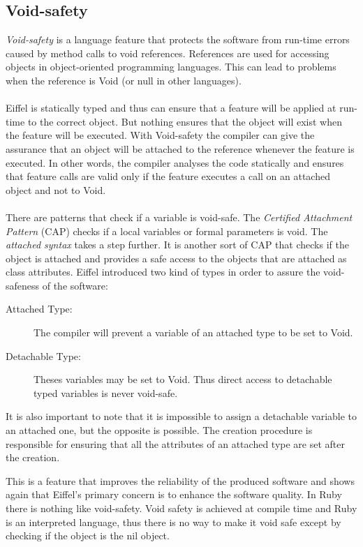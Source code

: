 \documentclass[12pt,a4paper,twocolumn]{article}
\begin{document}
\subsection{Void-safety}
\emph{Void-safety}\cite{voidSafety} is a language feature that protects the software from run-time errors caused by method calls to void references. References are used for accessing objects in object-oriented programming languages. This can lead to problems when the reference is Void (or null in other languages).
\\
\\
Eiffel is statically typed and thus can ensure that a feature will be applied at run-time to the correct object. But nothing ensures that the object will exist when the feature will be executed. With Void-safety the compiler can give the assurance that an object will be attached to the reference whenever the feature is executed. In other words, the compiler analyses the code statically and ensures that feature calls are valid only if the feature executes a call on an attached object and not to Void.
\\
\\
There are patterns that check if a variable is void-safe. The \emph{Certified Attachment Pattern} (CAP) checks if a local variables or formal parameters is void. The \emph{attached syntax} takes a step further. It is another sort of CAP that checks if the object is attached and provides a safe access to the objects that are attached as class attributes. Eiffel introduced two kind of types in order to assure the void-safeness of the software:
\begin{description}
\item[Attached Type: ] The compiler will prevent a variable of an attached type to be set to Void.
\item[Detachable Type: ] Theses variables may be set to Void. Thus direct access to detachable typed variables is never void-safe.%
\end{description}
It is also important to note that it is impossible to assign a detachable variable to an attached one, but the opposite is possible. The creation procedure is responsible for ensuring that all the attributes of an attached type are set after the creation. 

This is a feature that improves the reliability of the produced software and shows again that Eiffel's primary concern is to enhance the software quality. In Ruby there is nothing like void-safety. Void safety is achieved at compile time and Ruby is an interpreted language, thus there is no way to make it void safe except by checking if the object is the nil object.
\end{document}
